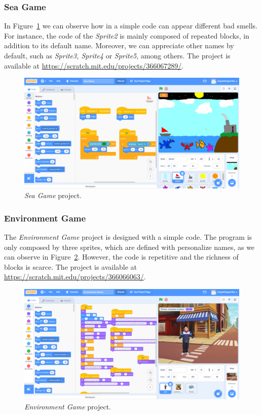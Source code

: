 \subsubsection{Sea Game}
\label{subsub:sea_game}

In Figure~\ref{fig:sea_game} we can observe how in a simple code can appear different bad smells. For instance, the code of the \textit{Sprite2} is mainly composed of repeated blocks, in addition to its default name. Moreover, we can appreciate other names by default, such as \textit{Sprite3, Sprite4} or \textit{Sprite5}, among others. The project is available at \url{https://scratch.mit.edu/projects/366067289/}.

 \begin{figure}
    \centering
    \includegraphics[width=13cm,                         keepaspectratio]{img/sea_game.png}
    \caption{\textit{Sea Game} project.}
    \label{fig:sea_game}
\end{figure}

\subsubsection{Environment Game}
\label{subsubsec:environment_game}

The \textit{Environment Game} project is designed with a simple code. The program is only composed by three sprites, which are defined with personalize names, as we can observe in Figure~\ref{fig:environment_game}. However, the code is repetitive and the richness of blocks is scarce. The project is available at \url{https://scratch.mit.edu/projects/366066063/}.

 \begin{figure}
    \centering
    \includegraphics[width=13cm,                         keepaspectratio]{img/environment_game.png}
    \caption{\textit{Environment Game} project.}
    \label{fig:environment_game}
\end{figure}

